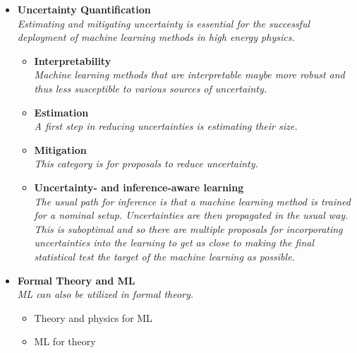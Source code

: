 \documentclass[12pt,letterpaper]{article}
\begin{document}
\begin{itemize}
\begin{itemize}
	\end{itemize}
\item \textbf{Uncertainty Quantification}
\\\textit{Estimating and mitigating uncertainty is essential for the successful deployment of machine learning methods in high energy physics. }
	\begin{itemize}
		\item \textbf{Interpretability}~\cite{deOliveira:2015xxd,Chang:2017kvc,Diefenbacher:2019ezd,Agarwal:2020fpt,Grojean:2020ech,Romero:2021qlf,Collins:2021pld,Mokhtar:2021bkf,Bradshaw:2022qev,Anzalone:2022hrt,Grojean:2022mef,Khot:2022aky,Roy:2022gge,Mengel:2023mnw}
		\\\textit{Machine learning methods that are interpretable maybe more robust and thus less susceptible to various sources of uncertainty.}
		\item \textbf{Estimation}~\cite{Nachman:2019dol,Nachman:2019yfl,Barnard:2016qma,Bellagente:2021yyh,Cheung:2022dil,Koh:2023wst,Golutvin:2023fle}
		\\\textit{A first step in reducing uncertainties is estimating their size.}
		\item \textbf{Mitigation}~\cite{Estrade:DLPS2017,Englert:2018cfo,Louppe:2016ylz,Araz:2021wqm,Stein:2022nvf}
		\\\textit{This category is for proposals to reduce uncertainty.}
		\item \textbf{Uncertainty- and inference-aware learning}~\cite{Caron:2019xkx,Bollweg:2019skg,deCastro:2018mgh,Wunsch:2020iuh,Ghosh:2021roe,Abudinen:2021qpc,Simpson:2022suz,Layer:2023lwi}
		\\\textit{The usual path for inference is that a machine learning method is trained for a nominal setup.  Uncertainties are then propagated in the usual way.  This is suboptimal and so there  are multiple proposals for incorporating uncertainties into the learning to get as close to making the final statistical test the target of the machine learning as possible.}
              \end{itemize}
\item \textbf{Formal Theory and ML}
\\\textit{ML can also be utilized in formal theory.}
        \begin{itemize}
        \item Theory and physics for ML~\cite{Erbin:2022lls,Zuniga-Galindo:2023hty,Banta:2023kqe,Zuniga-Galindo:2023uwp,Kumar:2023hlu,Demirtas:2023fir}
        \item ML for theory~\cite{Berglund:2022gvm,Erbin:2022rgx,Gerdes:2022nzr,Escalante-Notario:2022fik,Chen:2022jwd,Cheung:2022itk,He:2023csq,Lal:2023dkj,Dorrill:2023vox,Forestano:2023ijh,Dersy:2023job}

\end{itemize}
\end{itemize}
\end{document}
